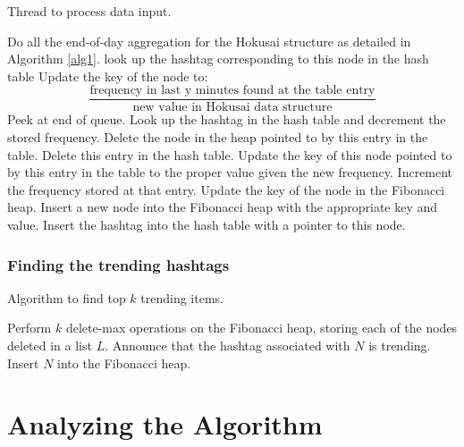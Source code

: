 \documentclass[twoside]{article}
\begin{document}
\begin{multicols}{2}
\begin{algorithm}
\caption{Thread to process data input.}
\begin{algorithmic}[1]
		\State Do all the end-of-day aggregation for the Hokusai structure as detailed in Algorithm \ref{alg1}.
			\State look up the hashtag corresponding to this node in the hash table
			\State Update the key of the node to: \[\frac{\text{frequency in last y minutes found at the table entry}}{\text{new value in Hokusai data structure}}\]
		\EndFor
	\EndIf
		\State Peek at end of queue.
			\State Look up the hashtag in the hash table and decrement the stored frequency.
				\State Delete the node in the heap pointed to by this entry in the table.
				\State Delete this entry in the hash table.
			\Else	
				\State Update the key of this node pointed to by this entry in the table to the proper value given the new frequency.
			\EndIf
		\EndIf
	\EndIf
		\State Increment the frequency stored at that entry.
		\State Update the key of the node in the Fibonacci heap.
	\Else
		\State Insert a new node into the Fibonacci heap with the appropriate key and value. 
		\State Insert the hashtag into the hash table with a pointer to this node.
 	\EndIf
\EndWhile
\end{algorithmic}
\end{algorithm}

\subsubsection{Finding the trending hashtags}

\begin{algorithm}
\caption{Algorithm to find top $k$ trending items.}
\begin{algorithmic}[1]
\State Perform $k$ delete-max operations on the Fibonacci heap, storing each of the nodes deleted in a list $L$.
	\State Announce that the hashtag associated with $N$ is trending.
	\State Insert $N$ into the Fibonacci heap.
\EndFor
\end{algorithmic}
\end{algorithm}



\section{Analyzing the Algorithm}


\end{multicols}
\end{document}
